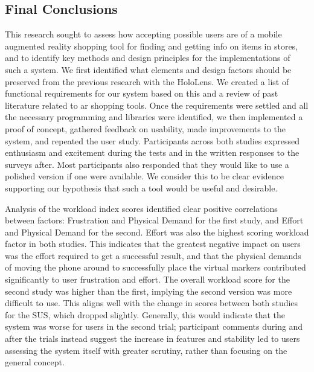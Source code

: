 \documentclass[thesis]{fputhesis}
\begin{document}
\begin{body}
\section{Final Conclusions}
This research sought to assess how accepting possible users are of a mobile augmented reality shopping tool for finding and getting info on items in stores, and to identify key methods and design principles for the implementations of such a system. We first identified what elements and design factors should be preserved from the previous research with the HoloLens. We created a list of functional requirements for our system based on this and a review of past literature related to \acrshort{ar} shopping tools. Once the requirements were settled and all the necessary programming  and libraries were identified, we then implemented a proof of concept, gathered feedback on usability, made improvements to the system, and repeated the user study. Participants across both studies expressed enthusiasm and excitement during the tests and in the written responses to the surveys after. Most participants also responded that they would like to use a polished version if one were available. We consider this to be clear evidence supporting our hypothesis that such a tool would be useful and desirable.

Analysis of the workload index scores identified clear positive correlations between factors: Frustration and Physical Demand for the first study, and Effort and Physical Demand for the second. Effort was also the highest scoring workload factor in both studies. This indicates that the greatest negative impact on users was the effort required to get a successful result, and that the physical demands of moving the phone around to successfully place the virtual markers contributed significantly to user frustration and effort. The overall workload score for the second study was higher than the first, implying the second version was more difficult to use. This aligns well with the change in scores between both studies for the SUS, which dropped slightly. Generally, this would indicate that the system was worse for users in the second trial; participant comments during and after the trials instead suggest the increase in features and stability led to users assessing the system itself with greater scrutiny, rather than focusing on the general concept.


\end{body}
\end{document}
